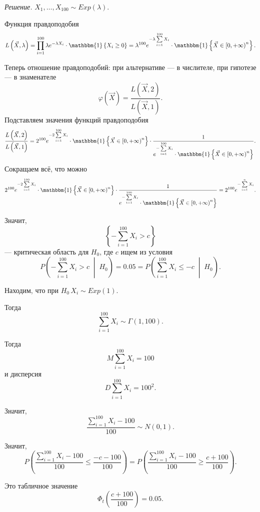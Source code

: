\textit{Решение.} $X_1, \dotsc, X_{100} \sim Exp \left( \lambda \right) $.

Функция правдоподобия
$$L \left( \vec{X}, \lambda \right) =
  \prod \limits_{i = 1}^{100}
    \lambda e^{- \lambda X_i} \cdot \mathbbm{1} \left\{ X_i \geq 0 \right\} =
  \lambda^{100} e^{- \lambda \sum \limits_{i = 1}^{100} X_i} \cdot
  \mathbbm{1} \left\{ \vec{X} \in \left[ 0, + \infty \right)^n \right\}.$$

Теперь отношение правдоподобий: при альтернативе --- в числителе, при гипотезе ---
в знаменателе
$$ \varphi \left( \vec{X} \right) =
  \frac{L \left( \vec{X}, 2 \right) }{L \left( \vec{X}, 1 \right) }.$$
Подставляем значения функций правдоподобия
$$ \frac{L \left( \vec{X}, 2 \right) }{L \left( \vec{X}, 1 \right) } =
  2^{100} e^{-2 \sum \limits_{i = 1}^{100} X_i} \cdot \mathbbm{1} \left\{ \vec{X} \in \left[ 0, + \infty \right)^n \right\} \cdot
  \frac{1}{e^{- \sum \limits_{i = 1}^{100} X_i} \cdot \mathbbm{1} \left\{ \vec{X} \in \left[ 0, + \infty \right)^n \right\} }.$$
Сокращаем всё, что можно
$$2^{100} e^{-2 \sum \limits_{i = 1}^{100} X_i} \cdot \mathbbm{1} \left\{ \vec{X} \in \left[ 0, + \infty \right)^n \right\} \cdot
  \frac{1}{e^{- \sum \limits_{i = 1}^{100} X_i} \cdot \mathbbm{1} \left\{ \vec{X} \in \left[ 0, + \infty \right)^n \right\} } =
  2^{100} e^{- \sum \limits_{i = 1}^n X_i}.$$

Значит,
$$ \left\{ - \sum \limits_{i = 1}^{100} X_i > c \right\} $$
--- критическая область для $H_0$, где $c$ ищем из условия
$$P \left( - \sum \limits_{i = 1}^{100} X_i > c \; \middle| \; H_0 \right) =
  0.05 =
  P \left( \sum \limits_{i = 1}^{100} X_i \leq - c \; \middle| \; H_0 \right).$$

Находим, что при $H_0 \, X_i \sim Exp \left( 1 \right) $.

Тогда
$$ \sum \limits_{i = 1}^{100} X_i \sim
  \Gamma \left( 1, 100 \right).$$

Тогда
$$M \sum \limits_{i = 1}^{100} X_i =
  100$$
и дисперсия
$$D \sum \limits_{i = 1}^{100} X_i =
  100^2.$$

Значит,
$$ \frac{ \sum \limits_{i = 1}^{100} X_i - 100}{100} \sim
  N \left( 0, 1 \right).$$

Значит,
$$P \left( \frac{ \sum \limits_{i = 1}^{100} X_i - 100}{100} \leq \frac{-c - 100}{100} \right) =
    P \left( \frac{ \sum \limits_{i = 1}^{100} X_i - 100}{100} \geq \frac{c + 100}{100} \right).$$

Это табличное значение
$$ \Phi_t \left( \frac{c + 100}{100} \right) =
  0.05.$$

